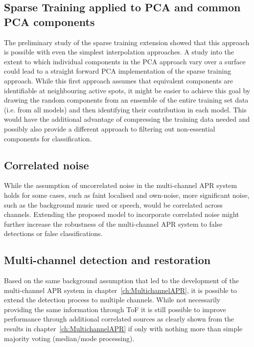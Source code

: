 \subsection{Sparse Training applied to PCA and common PCA components}
The preliminary study of the sparse training extension showed that this approach is possible with even the simplest interpolation approaches. A study into the extent to which individual components in the PCA approach vary over a surface could lead to a straight forward PCA implementation of the sparse training approach. While this first approach assumes that equivalent components are identifiable at neighbouring active spots, it might be easier to achieve this goal by drawing the random components from an ensemble of the entire training set data (i.e. from all models) and then identifying their contribution in each model. This would have the additional advantage of compressing the training data needed and possibly also provide a different approach to filtering out non-essential components for classification.

\subsection{Correlated noise}
While the assumption of uncorrelated noise in the multi-channel APR system holds for some cases, such as faint localised and own-noise, more significant noise, such as the background music used or speech, would be correlated across channels. Extending the proposed model to incorporate correlated noise might further increase the robustness of the multi-channel APR system to false detections or false classifications.

\subsection{Multi-channel detection and restoration}
Based on the same background assumption that led to the development of the multi-channel APR system in chapter~\ref{ch:MultichannelAPR}, it is possible to extend the detection process to multiple channels. While not necessarily providing the same information through ToF it is still possible to improve performance through additional correlated sources as clearly shown from the results in chapter~\ref{ch:MultichannelAPR} if only with nothing more than simple majority voting (median/mode processing).

